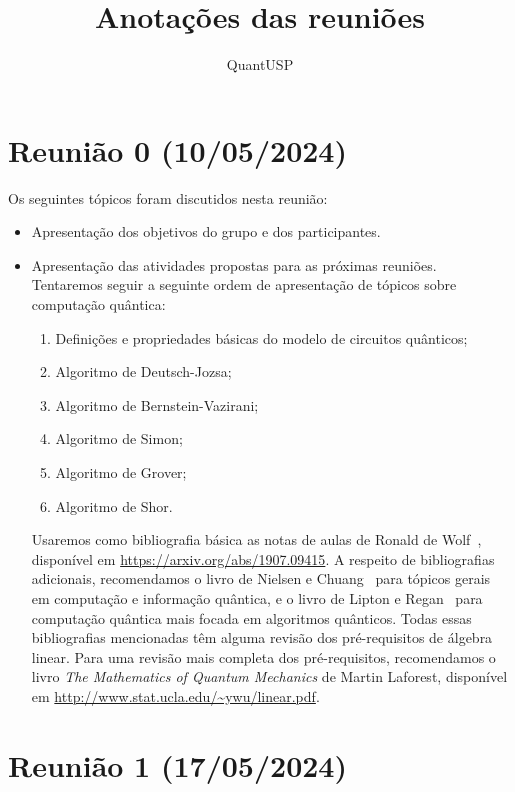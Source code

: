 \documentclass{article}
\title{Anotações das reuniões}
\author{QuantUSP}
\begin{document}
\maketitle

\section*{Reunião 0 (10/05/2024)}

Os seguintes tópicos foram discutidos nesta reunião:
\begin{itemize}
    \item Apresentação dos objetivos do grupo e dos participantes.
    \item Apresentação das atividades propostas para as próximas reuniões.
        Tentaremos seguir a seguinte ordem de apresentação de tópicos sobre computação quântica:
        \begin{enumerate}
            \item Definições e propriedades básicas do modelo de circuitos quânticos;
            \item Algoritmo de Deutsch-Jozsa;
            \item Algoritmo de Bernstein-Vazirani;
            \item Algoritmo de Simon;
            \item Algoritmo de Grover;
            \item Algoritmo de Shor.
        \end{enumerate}
        Usaremos como bibliografia básica as notas de aulas de Ronald de Wolf~\cite{deWolfLectureNotes},
        disponível em \url{https://arxiv.org/abs/1907.09415}.
        A respeito de bibliografias adicionais,
        recomendamos o livro de Nielsen e Chuang~\cite{NielsenChuangQCQI} para tópicos gerais em computação e informação quântica,
        e o livro de Lipton e Regan~\cite{LiptonReganIQALA} para computação quântica mais focada em algoritmos quânticos.
        Todas essas bibliografias mencionadas têm alguma revisão dos pré-requisitos de álgebra linear.
        Para uma revisão mais completa dos pré-requisitos, recomendamos o livro \emph{The Mathematics of Quantum Mechanics} de Martin Laforest,
        disponível em \url{http://www.stat.ucla.edu/~ywu/linear.pdf}.
\end{itemize}

\section*{Reunião 1 (17/05/2024)}
\end{document}
